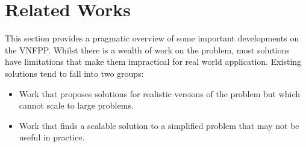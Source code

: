 \section{Related Works}
\label{sec:literature_review}

This section provides a pragmatic overview of some important developments on the VNFPP. Whilst there is a wealth of work on the problem, most solutions have limitations that make them impractical for real world application. Existing solutions tend to fall into two groups:
\begin{itemize}
    \item Work that proposes solutions for realistic versions of the problem but which cannot scale to large problems.
    \item Work that finds a scalable solution to a simplified problem that may not be useful in practice.
\end{itemize}

